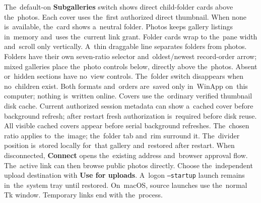 \documentclass[11pt,a4paper]{article}
\newcommand{\ui}[1]{\textbf{#1}}
\begin{document}
The~default-on \ui{Subgalleries} switch shows direct child-folder cards above
the~photos. Each cover uses the~first authorized direct thumbnail. When none
is~available, the~card shows a~neutral folder. Photos keeps gallery listings
in~memory and~uses the~current link grant.
Folder cards wrap to the~pane width and~scroll only vertically. A~thin draggable line
separates folders from photos. Folders have their own seven-ratio selector
and~oldest/newest record-order arrow; mixed galleries place the~photo controls
below, directly above the~photos. Absent or~hidden sections have no~view controls.
The~folder switch disappears when no~children exist. Both formats and~orders
are~saved only in~WinApp on~this computer; nothing is~written online.
Covers use the~ordinary verified thumbnail disk cache. Current authorized
session metadata can show a~cached cover before background refresh; after
restart fresh authorization is~required before disk reuse.
All visible cached covers appear before serial background refreshes. The~chosen
ratio applies to~the~image; the~folder tab and~rim surround it. The~divider
position is~stored locally for~that gallery and~restored after restart.
When disconnected, \ui{Connect} opens the~existing address and~browser
approval flow. The~active link can then browse public photos directly.
Choose the~independent upload destination with \ui{Use for uploads}.
A~logon \texttt{--startup} launch remains in~the~system tray until restored.
On~macOS, source launches use the~normal Tk window.
Temporary links end with the~process.
\end{document}
